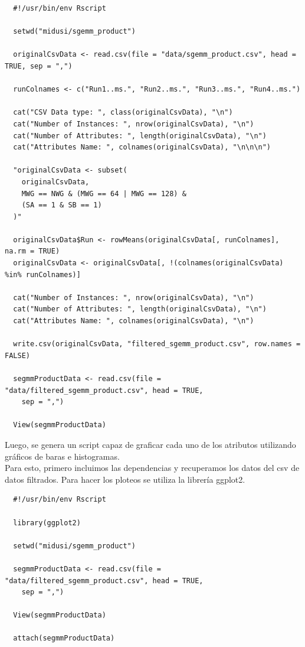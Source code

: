 \documentclass[osajnl,twocolumn,showpacs,superscriptaddress,10pt]{revtex4-1} %
\begin{document}
\begin{verbatim}
  #!/usr/bin/env Rscript

  setwd("midusi/sgemm_product")

  originalCsvData <- read.csv(file = "data/sgemm_product.csv", head = TRUE, sep = ",")

  runColnames <- c("Run1..ms.", "Run2..ms.", "Run3..ms.", "Run4..ms.")

  cat("CSV Data type: ", class(originalCsvData), "\n")
  cat("Number of Instances: ", nrow(originalCsvData), "\n")
  cat("Number of Attributes: ", length(originalCsvData), "\n")
  cat("Attributes Name: ", colnames(originalCsvData), "\n\n\n")

  "originalCsvData <- subset(
    originalCsvData,
    MWG == NWG & (MWG == 64 | MWG == 128) &
    (SA == 1 & SB == 1)
  )"

  originalCsvData$Run <- rowMeans(originalCsvData[, runColnames], na.rm = TRUE)
  originalCsvData <- originalCsvData[, !(colnames(originalCsvData) %in% runColnames)]

  cat("Number of Instances: ", nrow(originalCsvData), "\n")
  cat("Number of Attributes: ", length(originalCsvData), "\n")
  cat("Attributes Name: ", colnames(originalCsvData), "\n")

  write.csv(originalCsvData, "filtered_sgemm_product.csv", row.names = FALSE)

  segmmProductData <- read.csv(file = "data/filtered_sgemm_product.csv", head = TRUE,
    sep = ",")

  View(segmmProductData)
\end{verbatim}

Luego, se genera un script capaz de graficar cada uno de los atributos utilizando gráficos de baras e histogramas. \\

Para esto, primero incluimos las dependencias y recuperamos los datos del csv de datos filtrados. Para hacer los ploteos se utiliza la librería ggplot2. \\

\begin{verbatim}
  #!/usr/bin/env Rscript

  library(ggplot2)

  setwd("midusi/sgemm_product")

  segmmProductData <- read.csv(file = "data/filtered_sgemm_product.csv", head = TRUE,
    sep = ",")

  View(segmmProductData)

  attach(segmmProductData)
\end{verbatim}
\end{document}

